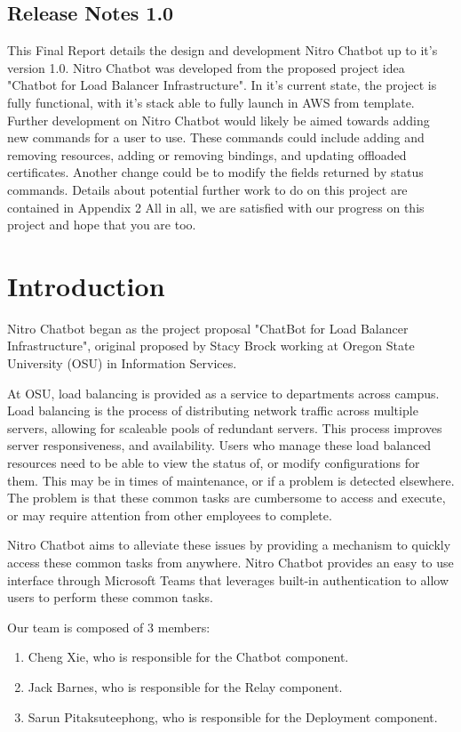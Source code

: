 \documentclass[onecolumn, draftclsnofoot,10pt, compsoc]{IEEEtran}
\begin{document}
\subsection{Release Notes 1.0}

This Final Report details the design and development Nitro Chatbot up to it's version 1.0.
Nitro Chatbot was developed from the proposed project idea "Chatbot for Load Balancer Infrastructure".
In it's current state, the project is fully functional, with it's stack able to fully launch in AWS from template.
Further development on Nitro Chatbot would likely be aimed towards adding new commands for a user to use.
These commands could include adding and removing resources, adding or removing bindings, and updating offloaded certificates.
Another change could be to modify the fields returned by status commands.
Details about potential further work to do on this project are contained in Appendix 2
All in all, we are satisfied with our progress on this project and hope that you are too.

\section{Introduction}
Nitro Chatbot began as the project proposal "ChatBot for Load Balancer Infrastructure", original proposed by Stacy Brock working at Oregon State University (OSU) in Information Services.

At OSU, load balancing is provided as a service to departments across campus.
Load balancing is the process of distributing network traffic across multiple servers, allowing for scaleable pools of redundant servers.
This process improves server responsiveness, and availability.
Users who manage these load balanced resources need to be able to view the status of, or modify configurations for them.
This may be in times of maintenance, or if a problem is detected elsewhere.
The problem is that these common tasks are cumbersome to access and execute, or may require attention from other employees to complete.

Nitro Chatbot aims to alleviate these issues by providing a mechanism to quickly access these common tasks from anywhere.
Nitro Chatbot provides an easy to use interface through Microsoft Teams that leverages built-in authentication to allow users to perform these common tasks.

Our team is composed of 3 members:
\begin{enumerate}
    \item Cheng Xie, who is responsible for the Chatbot component.
    \item Jack Barnes, who is responsible for the Relay component.
    \item Sarun Pitaksuteephong, who is responsible for the Deployment component.
\end{enumerate}
\end{document}
